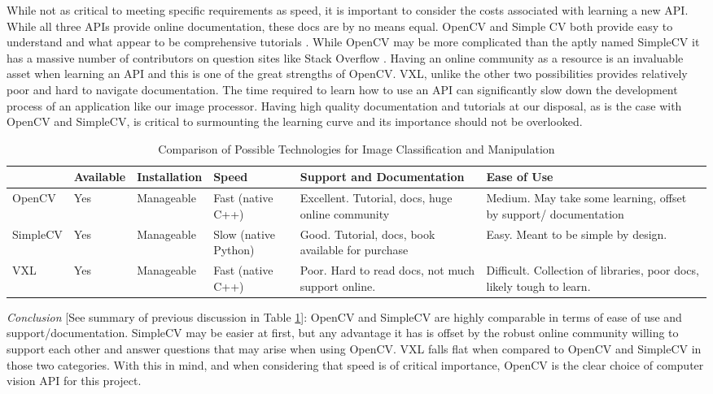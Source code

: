 \documentclass[10pt, onecolumn, draftclsnofoot, letterpaper, compsoc]{IEEEtran}
\begin{document}
While not as critical to meeting specific requirements as speed, it is important
to consider the costs associated with learning a new API. While all three APIs
provide online documentation, these docs are by no means equal. OpenCV and
Simple CV both provide easy to understand and what appear to be comprehensive
tutorials \cite{OCV, SCV}. While OpenCV may be more complicated than the aptly
named SimpleCV it has a massive number of contributors on question sites like
Stack Overflow \cite{stkovrflw}. Having an online community as a resource is an
invaluable asset when learning an API and this is one of the great strengths of
OpenCV. VXL, unlike the other two possibilities provides relatively poor and
hard to navigate documentation. The time required to learn how to use an API can
significantly slow down the development process of an application like our image
processor. Having high quality documentation and tutorials at our disposal, as
is the case with OpenCV and SimpleCV, is critical to surmounting the learning
curve and its importance should not be overlooked. \\

\begin{table}[h]
\centering
\caption{Comparison of Possible Technologies for Image Classification and Manipulation}
\begin{tabular}{|p{2.1cm}|p{2.1cm}|p{2.1cm}|p{2.1cm}|p{2.1cm}|p{2.1cm}|}
\cline{4-4}

\hline  & Available & Installation & Speed & Support and Documentation & Ease of
Use  \\ \hline

OpenCV  & Yes & Manageable & Fast (native C++) &  Excellent. Tutorial, docs, huge
online community & Medium. May take some learning, offset by support/
documentation  \\ \hline

SimpleCV & Yes & Manageable & Slow (native Python) & Good. Tutorial, docs, book
available for purchase & Easy. Meant to be simple by design.  \\ \hline

VXL & Yes & Manageable & Fast (native C++) & Poor. Hard to read docs, not much support
online. & Difficult. Collection of libraries, poor docs, likely tough to learn.
\\ \hline

\end{tabular}
\label{table:george1}
\end{table}

\textit{Conclusion} [See summary of previous discussion in Table
\ref{table:george1}]: OpenCV and SimpleCV are highly comparable in terms of ease
of use and support/documentation. SimpleCV may be easier at first, but any
advantage it has is offset by the robust online community willing to support
each other and answer questions that may arise when using OpenCV. VXL falls flat when compared to
OpenCV and SimpleCV in those two categories. With this in mind, and when
considering that speed is of critical importance, OpenCV is the clear choice of
computer vision API for this project. \\
\end{document}
